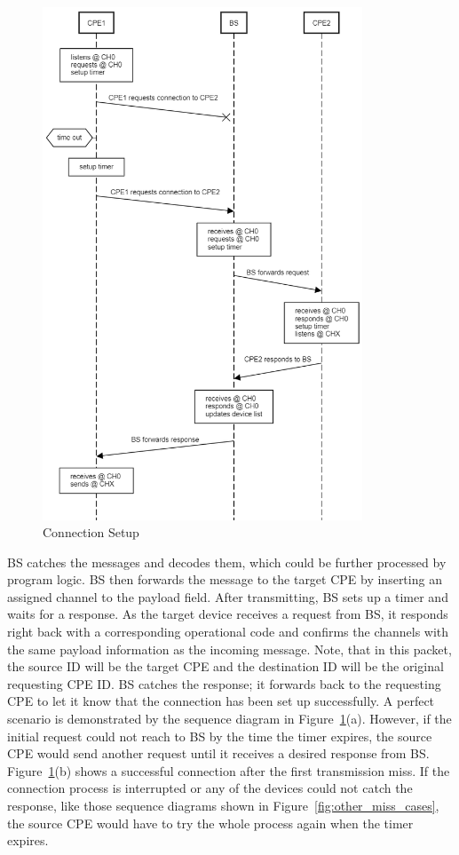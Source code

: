 \begin{figure}[ht]
{\begin{minipage}[c][1.5\width]{
	   0.4\textwidth}
	   \includegraphics[width=0.85\textwidth]{figures/sequence_diagram_first_miss_com.png}
	\end{minipage}}
\caption{Connection Setup}
\label{fig:connection_setup}
\end{figure}


BS catches the messages and decodes them, which could be further processed by program logic. BS then forwards the message to the target
CPE by inserting an assigned channel to the payload field. After transmitting, BS sets up a timer and waits for a response. As the target
device receives a request from BS, it responds right back with a corresponding operational code and confirms the channels with the same payload
information as the incoming message. Note, that in this packet, the source ID will be the target CPE and the destination ID will be the 
original requesting CPE ID. BS catches the response; it forwards back to the requesting CPE to let it know that the connection has been set up
successfully. A perfect scenario is demonstrated by the sequence diagram in Figure~\ref{fig:connection_setup}(a). However, if the initial 
request could not reach to BS by the time the timer expires, the source CPE would send another request until it receives a desired response from
BS. Figure~\ref{fig:connection_setup}(b) shows a successful connection after the first transmission miss. If the connection process is interrupted or
any of the devices could not catch the response, like those sequence diagrams shown in Figure~\ref{fig:other_miss_cases}, the source CPE would have to try the whole process again when the timer expires.

